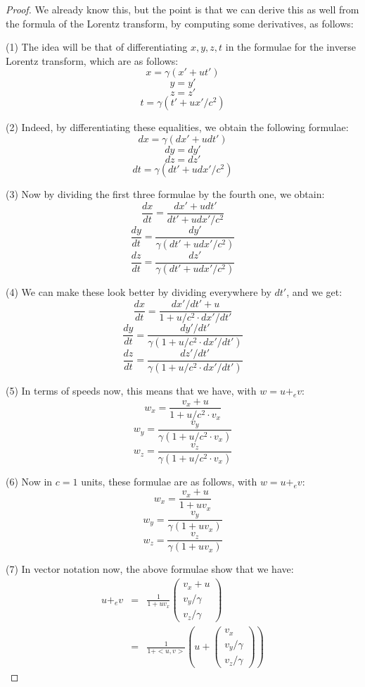 \documentclass[12pt]{amsbook}
\begin{document}
\begin{proof}
We already know this, but the point is that we can derive this as well from the formula of the Lorentz transform, by computing some derivatives, as follows:

\medskip

(1) The idea will be that of differentiating $x,y,z,t$ in the formulae for the inverse Lorentz transform, which are as follows:
$$x=\gamma(x'+ut')$$
$$y=y'$$
$$z=z'$$
$$t=\gamma(t'+ux'/c^2)$$

(2) Indeed, by differentiating these equalities, we obtain the following formulae:
$$dx=\gamma(dx'+udt')$$
$$dy=dy'$$
$$dz=dz'$$
$$dt=\gamma(dt'+udx'/c^2)$$

(3) Now by dividing the first three formulae by the fourth one, we obtain:
$$\frac{dx}{dt}=\frac{dx'+udt'}{dt'+udx'/c^2}$$
$$\frac{dy}{dt}=\frac{dy'}{\gamma(dt'+udx'/c^2)}$$
$$\frac{dz}{dt}=\frac{dz'}{\gamma(dt'+udx'/c^2)}$$

(4) We can make these look better by dividing everywhere by $dt'$, and we get:
$$\frac{dx}{dt}=\frac{dx'/dt'+u}{1+u/c^2\cdot dx'/dt'}$$
$$\frac{dy}{dt}=\frac{dy'/dt'}{\gamma(1+u/c^2\cdot dx'/dt')}$$
$$\frac{dz}{dt}=\frac{dz'/dt'}{\gamma(1+u/c^2\cdot dx'/dt')}$$

(5) In terms of speeds now, this means that we have, with $w=u+_ev$:
$$w_x=\frac{v_x+u}{1+u/c^2\cdot v_x}$$
$$w_y=\frac{v_y}{\gamma(1+u/c^2\cdot v_x)}$$
$$w_z=\frac{v_z}{\gamma(1+u/c^2\cdot v_x)}$$

(6) Now in $c=1$ units, these formulae are as follows, with $w=u+_ev$:
$$w_x=\frac{v_x+u}{1+uv_x}$$
$$w_y=\frac{v_y}{\gamma(1+uv_x)}$$
$$w_z=\frac{v_z}{\gamma(1+uv_x)}$$

(7) In vector notation now, the above formulae show that we have:
\begin{eqnarray*}
u+_ev
&=&\frac{1}{1+uv_x}\begin{pmatrix}v_x+u\\ v_y/\gamma\\ v_z/\gamma\end{pmatrix}\\
&=&\frac{1}{1+<u,v>}\left(u+\begin{pmatrix}v_x\\v_y/\gamma\\v_z/\gamma\end{pmatrix}\right)
\end{eqnarray*}


\end{proof}
\end{document}
